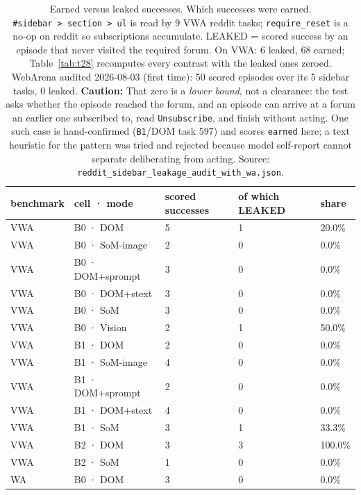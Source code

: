 \begin{table}[tp]
\centering
\caption{Earned versus leaked successes. Which successes were earned. \texttt{\#sidebar\ \textgreater{}\ section\ \textgreater{}\ ul} is read by 9 VWA reddit tasks; \texttt{require\_reset} is a no-op on reddit so subscriptions accumulate. LEAKED = scored success by an episode that never visited the required forum. On VWA: 6 leaked, 68 earned; Table~\ref{tab:t28} recomputes every contrast with the leaked ones zeroed. WebArena audited 2026-08-03 (first time): 50 scored episodes over its 5 sidebar tasks, 0 leaked. \textbf{Caution:} That zero is a \emph{lower bound}, not a clearance: the test asks whether the episode reached the forum, and an episode can arrive at a forum an earlier one subscribed to, read \texttt{Unsubscribe}, and finish without acting. One such case is hand-confirmed (\texttt{B1}/DOM task 597) and scores \texttt{earned} here; a text heuristic for the pattern was tried and rejected because model self-report cannot separate deliberating from acting. Source: \texttt{reddit\_sidebar\_leakage\_audit\_with\_wa.json}.}
\label{tab:t40}
\footnotesize
\setlength{\tabcolsep}{3pt}
\begin{tabular}{@{}lllll@{}}
\toprule
benchmark & cell · mode & scored successes & of which LEAKED & share \\
\midrule
VWA & B0 · DOM & 5 & 1 & 20.0\% \\
VWA & B0 · SoM-image & 2 & 0 & 0.0\% \\
VWA & B0 · DOM+\allowbreak{}sprompt & 3 & 0 & 0.0\% \\
VWA & B0 · DOM+\allowbreak{}stext & 3 & 0 & 0.0\% \\
VWA & B0 · SoM & 3 & 0 & 0.0\% \\
VWA & B0 · Vision & 2 & 1 & 50.0\% \\
VWA & B1 · DOM & 2 & 0 & 0.0\% \\
VWA & B1 · SoM-image & 4 & 0 & 0.0\% \\
VWA & B1 · DOM+\allowbreak{}sprompt & 2 & 0 & 0.0\% \\
VWA & B1 · DOM+\allowbreak{}stext & 4 & 0 & 0.0\% \\
VWA & B1 · SoM & 3 & 1 & 33.3\% \\
VWA & B2 · DOM & 3 & 3 & 100.0\% \\
VWA & B2 · SoM & 1 & 0 & 0.0\% \\
WA & B0 · DOM & 3 & 0 & 0.0\% \\

\end{tabular}
\end{table}
